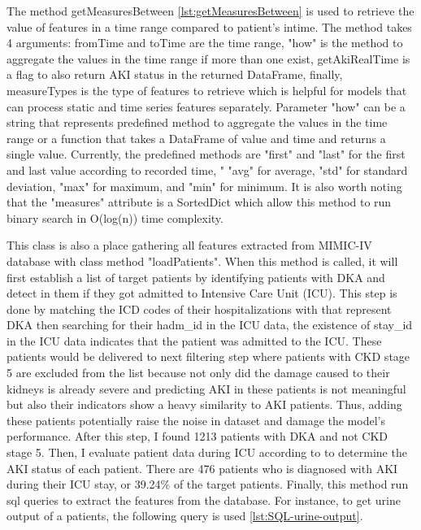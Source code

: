 \documentclass[../main.tex]{subfiles}
\begin{document}
The method getMeasuresBetween \ref{lst:getMeasuresBetween} is used to retrieve the value of features in a time range compared to patient's intime.
The method takes 4 arguments: fromTime and toTime are the time range, "how" is the method to aggregate the values in the time range if more than one exist, getAkiRealTime is a flag to also return AKI status in the returned DataFrame, finally, measureTypes is the type of features to retrieve which is helpful for models that can process static and time series features separately.
Parameter "how" can be a string that represents predefined method to aggregate the values in the time range or a function that takes a DataFrame of value and time and returns a single value.
Currently, the predefined methods are "first" and "last" for the first and last value according to recorded time, " "avg" for average, "std" for standard deviation, "max" for maximum, and "min" for minimum.
It is also worth noting that the "measures" attribute is a SortedDict which allow this method to run binary search in O(log(n)) time complexity.

This class is also a place gathering all features extracted from MIMIC-IV database with class method "loadPatients".
When this method is called, it will first establish a list of target patients by identifying patients with DKA and detect in them if they got admitted to Intensive Care Unit (ICU).
This step is done by matching the ICD codes of their hospitalizations with that represent DKA then searching for their hadm\_id in the ICU data, the existence of stay\_id in the ICU data indicates that the patient was admitted to the ICU.
These patients would be delivered to next filtering step where patients with CKD stage 5 are excluded from the list because not only did the damage caused to their kidneys is already severe and predicting AKI in these patients is not meaningful but also their indicators show a heavy similarity to AKI patients.
Thus, adding these patients potentially raise the noise in dataset and damage the model's performance.
After this step, I found 1213 patients with DKA and not CKD stage 5.
Then, I evaluate patient data during ICU according to  \cite{kdigo-aki-guideline} to determine the AKI status of each patient.
There are 476 patients who is diagnosed with AKI during their ICU stay, or 39.24\% of the target patients.
Finally, this method run sql queries to extract the features from the database.
For instance, to get urine output of a patients, the following query is used \ref{lst:SQL-urine-output}.
\end{document}

